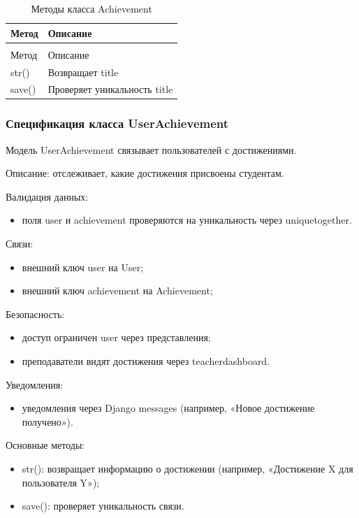 \begin{xltabular}{\textwidth}{|l|X|}
	\caption{Методы класса Achievement\label{tab:achievement_methods}}\\
	\hline
	Метод & Описание \\ \hline
	\endfirsthead
	\\
	\hline
	Метод & Описание \\ \hline
	\endhead
	str() & Возвращает title \\ \hline
	save() & Проверяет уникальность title \\ \hline
\end{xltabular}

\subsubsection{Спецификация класса UserAchievement}

Модель UserAchievement связывает пользователей с достижениями.


Описание: отслеживает, какие достижения присвоены студентам.

Валидация данных:
	\begin{itemize}
		\item поля user и achievement проверяются на уникальность через uniquetogether.
	\end{itemize}
	
Связи:
	\begin{itemize}
		\item внешний ключ user на User;
		\item внешний ключ achievement на Achievement;
	\end{itemize}
	
Безопасность:
	\begin{itemize}
		\item доступ ограничен user через представления;
		\item преподаватели видят достижения через teacherdashboard.
	\end{itemize}
	
Уведомления:
	\begin{itemize}
		\item уведомления через Django messages (например, «Новое достижение получено»).
	\end{itemize}
	
Основные методы:
	\begin{itemize}
		\item str(): возвращает информацию о достижении (например, «Достижение X для пользователя Y»);
		\item save(): проверяет уникальность связи.
	\end{itemize}
	
